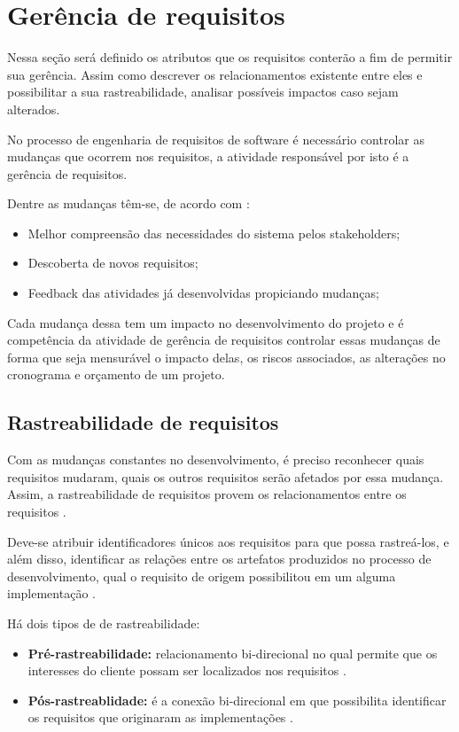 \chapter[Gerência de requisitos]{Gerência de requisitos}

Nessa seção será definido os atributos que os requisitos conterão a fim de permitir sua gerência. Assim como descrever os relacionamentos existente entre eles e possibilitar a sua rastreabilidade, analisar possíveis impactos  caso sejam alterados.

No processo de engenharia de requisitos de software é necessário controlar as mudanças que ocorrem nos requisitos, a atividade responsável por isto é a gerência de requisitos.

Dentre as mudanças têm-se, de acordo com \cite{silva2011}:
\begin{itemize}
    \item Melhor compreensão das necessidades do sistema pelos stakeholders;
    \item Descoberta de novos requisitos;
    \item Feedback das atividades já desenvolvidas propiciando mudanças;
\end{itemize}

Cada mudança dessa tem um impacto no desenvolvimento do projeto e é competência da atividade de gerência de requisitos controlar essas mudanças de forma que seja mensurável o impacto delas, os riscos associados, as alterações no cronograma e orçamento de um projeto.\cite{silva2011}

\section{Rastreabilidade de requisitos}

Com as mudanças constantes no desenvolvimento, é preciso reconhecer quais requisitos mudaram, quais os outros requisitos serão afetados por essa mudança. Assim, a rastreabilidade de requisitos provem os relacionamentos entre os requisitos \cite{leite2005}.

Deve-se atribuir identificadores únicos aos requisitos para que possa rastreá-los, e além disso, identificar as relações entre os artefatos produzidos no processo de desenvolvimento, qual o requisito de origem possibilitou em um alguma implementação \cite{silva2011}.

Há dois tipos de de rastreabilidade:
\begin{itemize}
    \item \textbf{Pré-rastreabilidade:} relacionamento bi-direcional no qual permite que os interesses do cliente possam ser localizados nos requisitos \cite{silva2011}.
    \item \textbf{Pós-rastreablidade:} é a conexão bi-direcional em que possibilita identificar os requisitos que originaram as implementações \cite{silva2011}.
\end{itemize}

